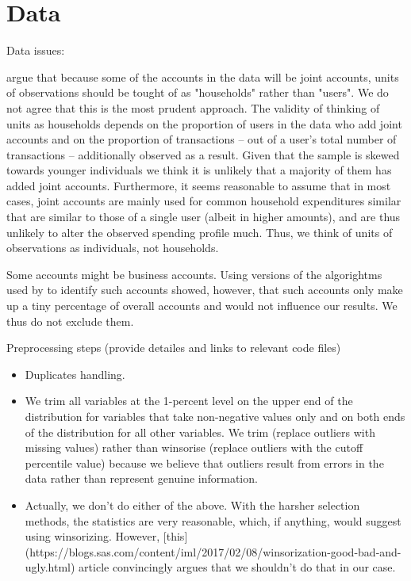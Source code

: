 
\section{Data}%
\label{sec:data}


Data issues:

\citet{bourquin2020effects} argue that because some of the accounts in the data
will be joint accounts, units of observations should be tought of as
"households" rather than "users". We do not agree that this is the most prudent
approach. The validity of thinking of units as households depends on the
proportion of users in the data who add joint accounts and on the proportion of
transactions -- out of a user's total number of transactions -- additionally observed as a
result. Given that the sample is skewed towards younger individuals we think it
is unlikely that a majority of them has added joint accounts. Furthermore, it
seems reasonable to assume that in most cases, joint accounts are mainly used
for common household expenditures similar that are similar to those of a single
user (albeit in higher amounts), and are thus unlikely to alter the observed
spending profile much. Thus, we think of units of observations as individuals,
not households. 

Some accounts might be business accounts. Using versions of the algorightms
used by \citet{bourquin2020effects} to identify such accounts showed, however,
that such accounts only make up a tiny percentage of overall accounts and would
not influence our results. We thus do not exclude them.


Preprocessing steps
(provide detailes and links to relevant code files)
\begin{itemize}
    \item Duplicates handling.
    \item We trim all variables at the 1-percent level on the upper end of the
        distribution for variables that take non-negative values only and on
        both ends of the distribution for all other variables. We trim
        (replace outliers with missing values) rather than winsorise (replace
        outliers with the cutoff percentile value) because we believe that
        outliers result from errors in the data rather than represent genuine
        information.
    \item Actually, we don't do either of the above. With the harsher selection
        methods, the statistics are very reasonable, which, if anything, would
        suggest using winsorizing. However,
        [this](https://blogs.sas.com/content/iml/2017/02/08/winsorization-good-bad-and-ugly.html)
        article convincingly argues that we shouldn't do that in our case.
\end{itemize}
